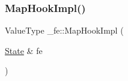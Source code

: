 \mbox{\label{namespace__fe_ae9577cf6364fac037b3be1e07193940c}} 
\subsubsection{\texorpdfstring{Map\+Hook\+Impl()}{MapHookImpl()}}
{\footnotesize\ttfamily Value\+Type \+\_\+fe\+::\+Map\+Hook\+Impl (\begin{DoxyParamCaption}\item[{\mbox{\hyperlink{struct__fe_1_1State}{State}} \&}]{fe }\end{DoxyParamCaption})}

